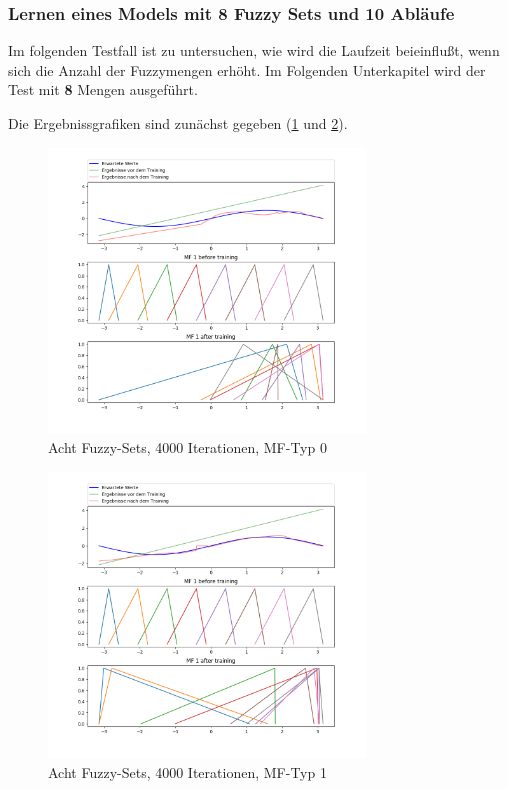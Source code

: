 \subsubsection{Lernen eines Models mit 8 Fuzzy Sets und 10 Abläufe}\label{m8fs10ab}
Im folgenden Testfall ist zu untersuchen, wie wird die Laufzeit beieinflußt, wenn sich die Anzahl der Fuzzymengen erhöht. Im Folgenden Unterkapitel wird der Test mit \textbf{8} Mengen ausgeführt.

Die Ergebnissgrafiken sind zunächst gegeben (\ref{8Sets4000_Stoch_0} und \ref{8Sets4000_Stoch_1}).

\begin{figure}[htbp]\label{8Sets4000_Stoch_0}
	\centering
	\includegraphics[width=0.75\textwidth]{images/sinus/Stochastic/sinus 1 Input 8 Sets 4000 Epochs Stochastic Gradient Descent two equations mf.png}
	\caption{Acht Fuzzy-Sets, 4000 Iterationen, MF-Typ 0}
\end{figure}
\begin{figure}[htbp]\label{8Sets4000_Stoch_1}
	\centering
	\includegraphics[width=0.75\textwidth]{images/sinus/Stochastic/sinus 1 Input 8 Sets 4000 Epochs Stochastic Gradient Descent one equation mf.png}
	\caption{Acht Fuzzy-Sets, 4000 Iterationen, MF-Typ 1}
\end{figure}

